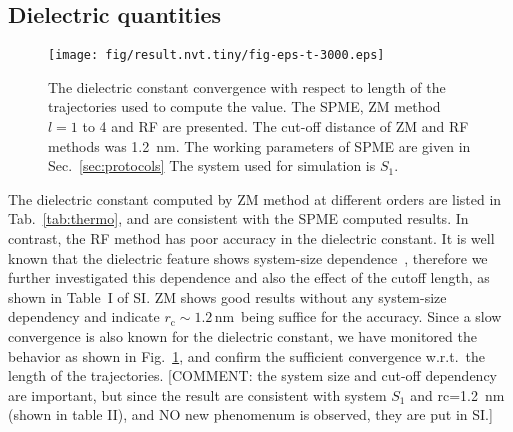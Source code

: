 \documentclass[a4paper,preprint,unsortedaddress,onecolumn,fleqn]{revtex4}
\newcommand{\recheck}[1]{{\color{red} #1}}
\newcommand{\systemlb}{L_1}
\begin{document}

\subsection{Dielectric quantities}

\begin{figure}[tbp]
\centering
\texttt{[image: fig/result.nvt.tiny/fig-eps-t-3000.eps]}
\caption{The dielectric constant convergence with respect to
  length of the trajectories used to compute the value.
  The SPME, ZM method $l=1$ to 4 and RF are presented.
  The cut-off distance of ZM and RF methods was 1.2~nm. The working parameters of SPME are given in Sec.~\ref{sec:protocols}
  The system used for simulation is $S_1$.
}
\label{fig:eps-conv}
\end{figure}

The dielectric constant computed by ZM method at different orders are listed
in Tab.~\ref{tab:thermo}, and are consistent with the SPME computed results.
In contrast, the RF method has poor accuracy in the dielectric constant.
It is
well known that the dielectric feature shows system-size dependence~\cite%
{vanderSpoel2006origin}, therefore we further investigated this dependence
and also the effect of the cutoff length, as shown in Table~I of SI. ZM shows
good results without any \recheck{system-size dependency} and indicate $r_{\text{c}}\sim
1.2\, $nm\ being suffice for the accuracy. Since a slow convergence is also known for
the dielectric constant, we have monitored the behavior as shown in Fig.~\ref{fig:eps-conv},
and confirm the sufficient convergence w.r.t.~the length of the trajectories.
\recheck{[COMMENT: the system size and cut-off dependency
  are important,
  but since the result are consistent with system $S_1$ and rc=1.2~nm (shown in table II),
  and NO new phenomenum is observed, 
  they are put in SI.]}
\end{document}
